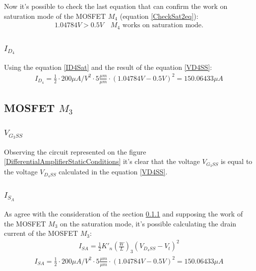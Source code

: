 \documentclass[10pt,a4paper]{book}
\begin{document}
Now it's possible to check the last equation that can confirm the work on saturation mode of the MOSFET $M_4$ (equation \ref{CheckSat2eq}):
\begin{align}
1.04784V > 0.5V \quad M_4 \text{ works on saturation mode.} \label{M4SatConfirm}
\end{align}

\subsubsection{$I_{D_4}$}
Using the equation \ref{ID4Sat} and the result of the equation \ref{VD4SS}:
\begin{align}
I_{D_4} = \frac{1}{2}\cdot 200 \mu A/V^2\cdot 5 \frac{\mu m}{\mu m} \cdot \left(1.04784V -0.5V \right)^2 = 150.06433 \mu A \label{ID4SatResult}
\end{align}

\subsection{MOSFET $M_3$}
\subsubsection{$V_{G_3SS}$}\label{VG3SS}
Observing the circuit represented on the figure \ref{DifferentialAmplifierStaticConditions} it's clear that the voltage $V_{G_3SS}$  is equal to the voltage $V_{D_4SS}$ calculated in the equation \ref{VD4SS}.

\subsubsection{$I_{S_A}$}
As agree with the consideration of the section \ref{VG3SS} and supposing the work of the MOSFET $M_3$ on the saturation mode, it's possible calculating the drain current of the MOSFET $M_3$:\\

\begin{align}
I_{SA} = \frac{1}{2}{K'}_n \left(\frac{W}{L}\right)_3 (V_{D_4SS} - V_t)^2
\end{align}
\begin{align}
I_{SA} = \frac{1}{2}\cdot 200 \mu A/V^2\cdot 5 \frac{\mu m}{\mu m} \cdot \left(1.04784V -0.5V \right)^2 = 150.06433 \mu A \label{ISASat}
\end{align}
\end{document}
